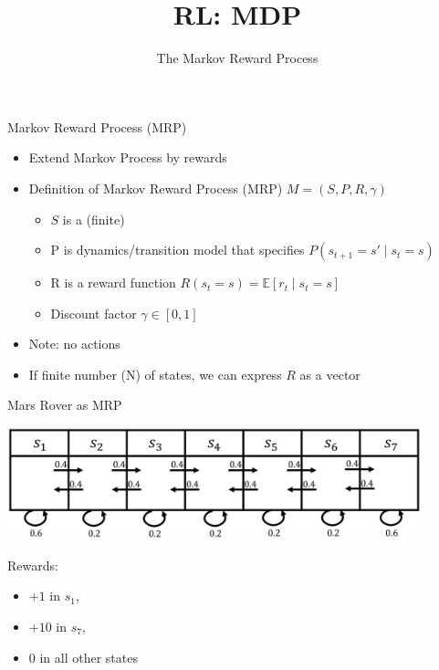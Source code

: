 


\title[Reinforcement Learning: Big Picture]{RL: MDP}
\subtitle{The Markov Reward Process}




	
	\maketitle

\begin{frame}[c]{Markov Reward Process (MRP)}

\begin{itemize}
	\item Extend Markov Process by rewards
	\item Definition of Markov Reward Process (MRP) $M =(S, P, R, \gamma)$
	\begin{itemize}
		\item $S$ is a (finite)
		\item P is dynamics/transition model that specifies $P(s_{t+1}=s' \mid s_t = s)$
		\item R is a reward function $R(s_t = s) = \mathbb{E}[r_t \mid s_t = s]$
		\item Discount factor $\gamma \in [0,1]$
	\end{itemize}
	\item Note: no actions
	\item If finite number (N) of states, we can express $R$ as a vector
\end{itemize}

\end{frame}
\begin{frame}[c]{Mars Rover as MRP}
	
\begin{center}
	\includegraphics[width=0.9\textwidth]{images/mars_rover_markov_process_2.png}
\end{center}

Rewards:
\begin{itemize}
	\item $+1$ in $s_1$, 
	\item $+10$ in $s_7$,
	\item $0$ in all other states
\end{itemize}
	
\end{frame}
